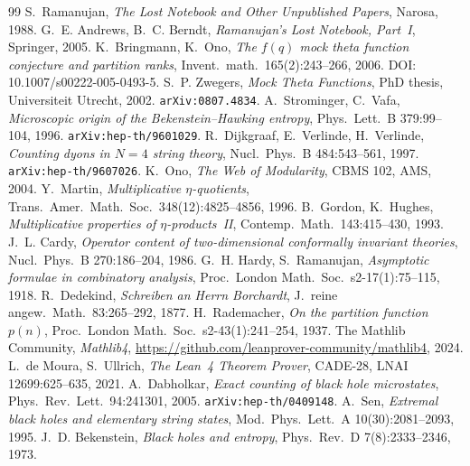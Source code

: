 \documentclass[11pt,a4paper]{article}
\theoremstyle{plain}
\theoremstyle{definition}
\begin{document}

\begin{thebibliography}{99}
 S.~Ramanujan, \emph{The Lost Notebook and Other Unpublished Papers}, Narosa, 1988.
 G.~E. Andrews, B.~C. Berndt, \emph{Ramanujan's Lost Notebook, Part~I}, Springer, 2005.
 K.~Bringmann, K.~Ono, \emph{The $f(q)$ mock theta function conjecture and partition ranks}, Invent.\ math.\ 165(2):243--266, 2006. DOI: 10.1007/s00222-005-0493-5.
 S.~P. Zwegers, \emph{Mock Theta Functions}, PhD thesis, Universiteit Utrecht, 2002. \texttt{arXiv:0807.4834}.
 A.~Strominger, C.~Vafa, \emph{Microscopic origin of the Bekenstein--Hawking entropy}, Phys.\ Lett.\ B 379:99--104, 1996. \texttt{arXiv:hep-th/9601029}.
 R.~Dijkgraaf, E.~Verlinde, H.~Verlinde, \emph{Counting dyons in $N=4$ string theory}, Nucl.\ Phys.\ B 484:543--561, 1997. \texttt{arXiv:hep-th/9607026}.
 K.~Ono, \emph{The Web of Modularity}, CBMS 102, AMS, 2004.
 Y.~Martin, \emph{Multiplicative $\eta$-quotients}, Trans.\ Amer.\ Math.\ Soc.\ 348(12):4825--4856, 1996.
 B.~Gordon, K.~Hughes, \emph{Multiplicative properties of $\eta$-products~II}, Contemp.\ Math.\ 143:415--430, 1993.
 J.~L. Cardy, \emph{Operator content of two-dimensional conformally invariant theories}, Nucl.\ Phys.\ B 270:186--204, 1986.
 G.~H. Hardy, S.~Ramanujan, \emph{Asymptotic formulae in combinatory analysis}, Proc.\ London Math.\ Soc.\ s2-17(1):75--115, 1918.
 R.~Dedekind, \emph{Schreiben an Herrn Borchardt}, J.\ reine angew.\ Math.\ 83:265--292, 1877.
 H.~Rademacher, \emph{On the partition function $p(n)$}, Proc.\ London Math.\ Soc.\ s2-43(1):241--254, 1937.
 The Mathlib Community, \emph{Mathlib4}, \url{https://github.com/leanprover-community/mathlib4}, 2024.
 L.~de Moura, S.~Ullrich, \emph{The Lean~4 Theorem Prover}, CADE-28, LNAI 12699:625--635, 2021.
 A.~Dabholkar, \emph{Exact counting of black hole microstates}, Phys.\ Rev.\ Lett.\ 94:241301, 2005. \texttt{arXiv:hep-th/0409148}.
 A.~Sen, \emph{Extremal black holes and elementary string states}, Mod.\ Phys.\ Lett.\ A 10(30):2081--2093, 1995.
 J.~D. Bekenstein, \emph{Black holes and entropy}, Phys.\ Rev.\ D 7(8):2333--2346, 1973.

\end{thebibliography}
\end{document}
